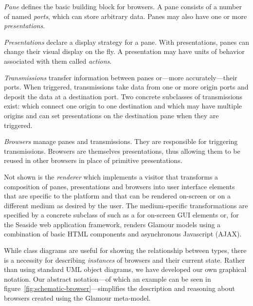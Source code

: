 \documentclass[a4paper,10pt,twoside]{book}
\begin{document}
\emph{Pane} defines the basic building block for browsers. A pane
consists of a number of named \emph{ports}, which can store arbitrary
data. Panes may also have one or more \emph{presentations}.

\emph{Presentations} declare a display strategy for a pane. With
presentations, panes can change their visual display on the fly. A
presentation may have units of behavior associated with them called
\emph{actions}.

\emph{Transmissions} transfer information between panes or---more accurately---their ports. When triggered, transmissions take data from one or more origin ports and deposit the data at a destination port. Two concrete subclasses of transmissions exist:  which connect one origin to one destination and  which may have multiple origins and can set presentations on the destination pane when they are triggered.

\emph{Browsers} manage panes and transmissions. They are responsible for triggering transmissions. Browsers are themselves presentations, thus allowing them to be reused in other browsers in place of primitive presentations.

Not shown is the \emph{renderer} which implements a visitor that
transforms a composition of panes, presentations and browsers into
user interface elements that are specific to the platform and that can
be rendered on-screen or on a different medium as desired by the
user. The medium-specific transformations are specified by a concrete
subclass of  such as a  for
on-screen GUI elements or, for the Seaside web application framework,
 renders Glamour models using a combination of basic
HTML components and asynchronous Javascript (AJAX).

While class diagrams are useful for showing the relationship between
types, there is a necessity for describing \emph{instances} of
browsers and their current state. Rather than using standard UML
object diagrams, we have developed our own graphical notation. Our
abstract notation---of which an example can be seen in
figure~\ref{fig:schematic-browser}---simplifies the description and
reasoning about browsers created using the Glamour meta-model.
\end{document}
